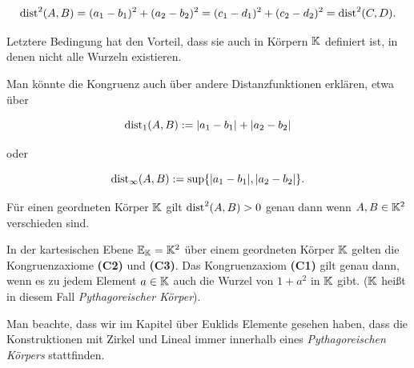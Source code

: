 $$
\operatorname{dist}^2(A,B) = (a_1 - b_1)^2 + (a_2 - b_2)^2 = (c_1 - d_1)^2 + (c_2 - d_2)^2 = \operatorname{dist}^2(C,D).
$$

Letztere Bedingung hat den Vorteil, dass sie auch in Körpern $\mathbb K$ definiert ist, in denen nicht alle
Wurzeln existieren.


Man könnte die Kongruenz auch über andere Distanzfunktionen erklären, etwa über

$$
    \operatorname{dist}_1(A,B) := |a_1 - b_1| + |a_2 - b_2|
$$

oder

$$
    \operatorname{dist}_{\infty}(A,B) := \sup \{ |a_1 - b_1|, |a_2 - b_2| \}.
$$


Für einen geordneten Körper $\mathbb K$ gilt $\operatorname{dist}^2(A,B) > 0$ genau dann wenn $A, B\in \mathbb K^2$ verschieden
sind.

\begin{thm}
    In der kartesischen Ebene $\mathbb E_{\mathbb K} = \mathbb K^2$ über einem geordneten Körper $\mathbb K$ gelten die
    Kongruenzaxiome {\bf (C2)} und  {\bf (C3)}. Das Kongruenzaxiom {\bf (C1)} gilt genau dann, wenn
    es zu jedem Element $a \in \mathbb K$ auch die Wurzel von $1 + a^2$ in $\mathbb K$ gibt. ($\mathbb K$ heißt in diesem
    Fall {\em Pythagoreischer Körper}).
\end{thm}

Man beachte, dass wir im Kapitel über Euklids Elemente gesehen haben, dass die Konstruktionen mit
Zirkel und Lineal immer innerhalb eines {\em Pythagoreischen Körpers} stattfinden.


